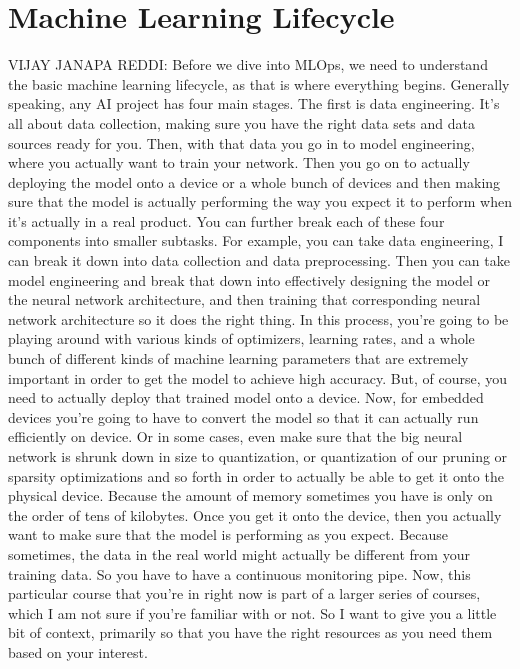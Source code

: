 \section{Machine Learning Lifecycle}

VIJAY JANAPA REDDI: Before we dive into MLOps,
we need to understand the basic machine learning lifecycle,
as that is where everything begins.
Generally speaking, any AI project has four main stages.
The first is data engineering.
It's all about data collection, making sure you have the right data sets
and data sources ready for you.
Then, with that data you go in to model engineering,
where you actually want to train your network.
Then you go on to actually deploying the model
onto a device or a whole bunch of devices
and then making sure that the model is actually
performing the way you expect it to perform
when it's actually in a real product.
You can further break each of these four components into smaller subtasks.
For example, you can take data engineering,
I can break it down into data collection and data preprocessing.
Then you can take model engineering and break that down into effectively
designing the model or the neural network architecture,
and then training that corresponding neural network architecture
so it does the right thing.
In this process, you're going to be playing around
with various kinds of optimizers, learning rates,
and a whole bunch of different kinds of machine
learning parameters that are extremely important in order to get the model
to achieve high accuracy.
But, of course, you need to actually deploy that trained model
onto a device.
Now, for embedded devices you're going to have to convert the model so that it
can actually run efficiently on device.
Or in some cases, even make sure that the big neural network
is shrunk down in size to quantization, or quantization of our pruning
or sparsity optimizations and so forth in order
to actually be able to get it onto the physical device.
Because the amount of memory sometimes you
have is only on the order of tens of kilobytes.
Once you get it onto the device, then you actually
want to make sure that the model is performing as you expect.
Because sometimes, the data in the real world
might actually be different from your training data.
So you have to have a continuous monitoring pipe.
Now, this particular course that you're in right now
is part of a larger series of courses, which I am not
sure if you're familiar with or not.
So I want to give you a little bit of context, primarily
so that you have the right resources as you need them based on your interest.
